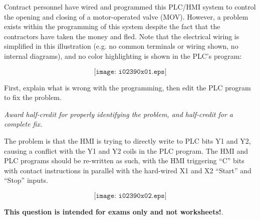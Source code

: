 

Contract personnel have wired and programmed this PLC/HMI system to control the opening and closing of a motor-operated valve (MOV).  However, a problem exists within the programming of this system despite the fact that the contractors have taken the money and fled.  Note that the electrical wiring is simplified in this illustration (e.g. no common terminals or wiring shown, no internal diagrams), and no color highlighting is shown in the PLC's program:

$$\texttt{[image: i02390x01.eps]}$$

First, explain what is wrong with the programming, then edit the PLC program to fix the problem.







{\it Award half-credit for properly identifying the problem, and half-credit for a complete fix.}

\vskip 10pt

The problem is that the HMI is trying to directly write to PLC bits Y1 and Y2, causing a conflict with the Y1 and Y2 coils in the PLC program.  The HMI and PLC programs should be re-written as such, with the HMI triggering ``C'' bits with contact instructions in parallel with the hard-wired X1 and X2 ``Start'' and ``Stop'' inputs.

$$\texttt{[image: i02390x02.eps]}$$







{\bf This question is intended for exams only and not worksheets!}.



